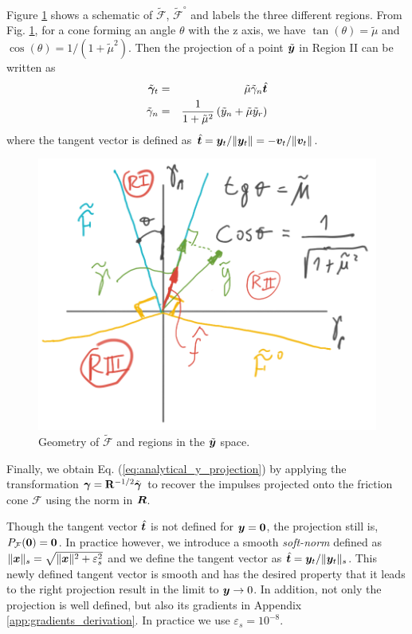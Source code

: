 Figure \ref{fig:cone_regions} shows a schematic of
$\tilde{\mathcal{F}}$, $\tilde{\mathcal{F}}^\circ$ and labels the three
different regions. From Fig. \ref{fig:cone_regions}, for a cone forming an angle
$\theta$ with the z axis, we have $\tan(\theta)=\tilde\mu$ and
$\cos(\theta)=1/(1+\tilde\mu^2)$. Then the projection of a point
$\tilde{{\bm{y}}}$ in Region II can be written as
\begin{eqnarray}
	\tilde{{\bm\gamma}}_t &=& \tilde{\mu}\tilde{\gamma}_n\hat{{\bm{t}}}\nonumber\\
	\tilde{\gamma}_n &=& \frac{1}{1+\tilde{\mu}^2}\left(\tilde{y}_n +
	\tilde{\mu}\tilde{y}_r\right)\nonumber		
\end{eqnarray}
where the tangent vector is defined as
$\hat{{\bm{t}}}={\bm{y}}_t/\Vert{\bm{y}}_t\Vert=-{\bm{v}}_t/\Vert{\bm{v}}_t\Vert$. 
\begin{figure}[!h]
    \centering
    \includegraphics[width=0.45\columnwidth]{figures/cone_regions.png}
    \caption{Geometry of $\tilde{\mathcal{F}}$ and regions in the
    $\tilde{{\bm{y}}}$ space.}
    \label{fig:cone_regions}
\end{figure}

Finally, we obtain Eq. (\ref{eq:analytical_y_projection}) by applying the transformation
${\bm\gamma}={\mathbf{R}}^{-1/2}\tilde{{\bm\gamma}}$ to recover the impulses projected onto the
friction cone $\mathcal{F}$ using the norm in ${\bm{R}}$.

Though the tangent vector $\hat{{\bm{t}}}$ is not defined for ${\bm{y}}={\bm{0}}$, the
projection still is, $P_\mathcal{F}({\bm{0}})={\bm{0}}$. In practice however, we
introduce a smooth \emph{soft-norm} defined as
$\|{\bm{x}}\|_s=\sqrt{\|{\bm{x}}\|^2+\varepsilon_s^2}$ and we define the tangent
vector as $\hat{{\bm{t}}}={\bm{y}}_t/\Vert{\bm{y}}_t\Vert_s$. This newly defined tangent vector is smooth and has the desired property that it leads to the right
projection result in the limit to ${\bm{y}}\rightarrow 0$. In addition, not only
the projection is well defined, but also its gradients in Appendix
\ref{app:gradients_derivation}. In practice we use $\varepsilon_s=10^{-8}$.

